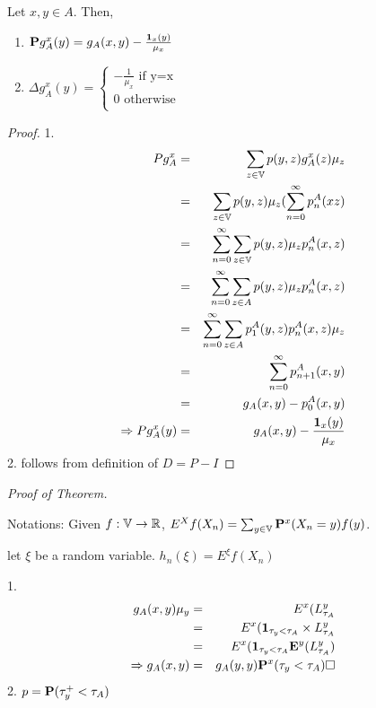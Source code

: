 \documentclass[main]{subfiles}
\begin{document}
\begin{lemma}
    Let $x,y \in A$. Then,
    \begin{enumerate}
        \item $\mathbf{P}g_A^x(y)= g_A(x,y)-\frac{\1_x(y)}{\mu_x}$
        \item $\Delta g_A^x(y)=
                  \begin{cases}
                      -\frac{1}{\mu_x} \text{  	if y=x} \\
                      0 \text{ 	 otherwise}             \\
                  \end{cases}$
    \end{enumerate}
\end{lemma}
\begin{proof}
    1.
    \begin{eqnarray*}
        Pg_A^x&=& \sum_{z \in \V} p(y,z)g_A^x(z)\mu_z \\
        &=& \sum_{z \in \V} p(y,z)\mu_z (\suminf p_n^A(xz) \\
        &=& \suminf \sum_{z \in \V} p(y,z)\mu_z p_n^A(x,z) \\
        &=& \suminf \sum_{z \in A} p(y,z)\mu_z p_n^A(x,z) \\
        &=& \suminf \sum_{z \in A} p_1^A(y,z)p_n^A(x,z)\mu_z \\
        &=& \suminf p_{n+1}^A(x,y) \\
        &=& g_A(x,y) - p_0^A(x,y) \\
        \Rightarrow Pg_A^x(y)&=&g_A(x,y)-\frac{\1_x(y)}{\mu_x}
    \end{eqnarray*}
    2. follows from definition of $D=P-I$
\end{proof}

\textit{Proof of Theorem.}

Notations: Given $f: \V \rightarrow \R$, $E^Xf(X_n)=\sum_{y \in \V} \P^x(X_n=y)f(y)$.

let $\xi$ be a random variable. $h_n(\xi)=E^{\xi} f(X_n)$

1.
\begin{eqnarray*}
    g_A(x,y)\mu_y &=& E^x(L_{\tau_A}^y \\
    &=& E^x(\1_{\tau_y < \tau_A} \times L_{\tau_A}^y \\
    &=& E^x(\1_{\tau_y < \tau_A} \E^y (L_{\tau_A}^y) \\
    \Rightarrow g_A(x,y) &=& g_A(y,y)\P^x(\tau_y < \tau_A) \square
\end{eqnarray*}
2. $p=\P(\tau_y^+<\tau_A)$
\end{document}
